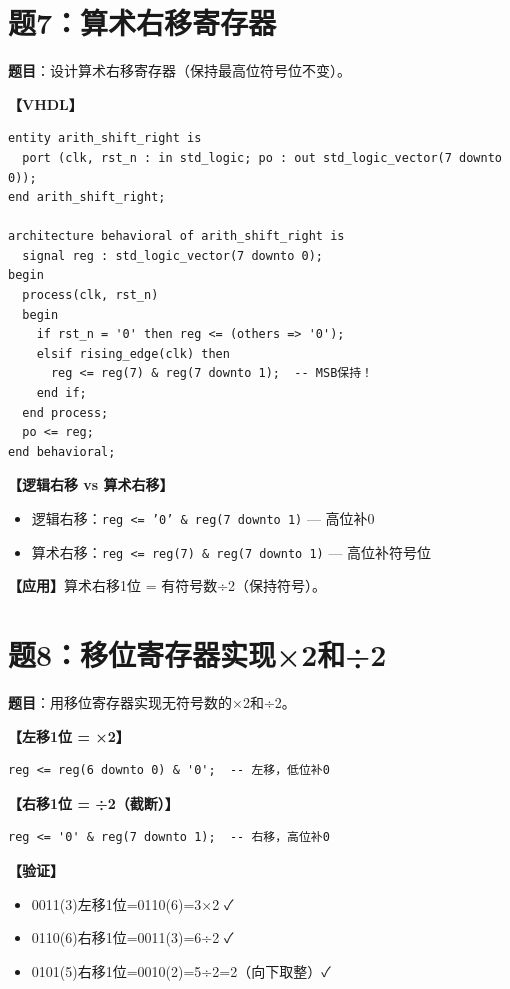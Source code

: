 \section{题7：算术右移寄存器}

\textbf{题目}：设计算术右移寄存器（保持最高位符号位不变）。

\begin{solution}[完整解答]

\textbf{【VHDL】}
\begin{lstlisting}
entity arith_shift_right is
  port (clk, rst_n : in std_logic; po : out std_logic_vector(7 downto 0));
end arith_shift_right;

architecture behavioral of arith_shift_right is
  signal reg : std_logic_vector(7 downto 0);
begin
  process(clk, rst_n)
  begin
    if rst_n = '0' then reg <= (others => '0');
    elsif rising_edge(clk) then
      reg <= reg(7) & reg(7 downto 1);  -- MSB保持！
    end if;
  end process;
  po <= reg;
end behavioral;
\end{lstlisting}

\textbf{【逻辑右移 vs 算术右移】}
\begin{itemize}
  \item 逻辑右移：\texttt{reg <= '0' \& reg(7 downto 1)} — 高位补0
  \item 算术右移：\texttt{reg <= reg(7) \& reg(7 downto 1)} — 高位补符号位
\end{itemize}

\textbf{【应用】}算术右移1位 = 有符号数÷2（保持符号）。

\end{solution}


\section{题8：移位寄存器实现×2和÷2}

\textbf{题目}：用移位寄存器实现无符号数的×2和÷2。

\begin{solution}[完整解答]

\textbf{【左移1位 = ×2】}
\begin{lstlisting}
reg <= reg(6 downto 0) & '0';  -- 左移，低位补0
\end{lstlisting}

\textbf{【右移1位 = ÷2（截断）】}
\begin{lstlisting}
reg <= '0' & reg(7 downto 1);  -- 右移，高位补0
\end{lstlisting}

\textbf{【验证】}
\begin{itemize}
  \item 0011(3)左移1位=0110(6)=3×2 ✓
  \item 0110(6)右移1位=0011(3)=6÷2 ✓
  \item 0101(5)右移1位=0010(2)=5÷2=2（向下取整）✓
\end{itemize}

\end{solution}


